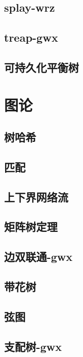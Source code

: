 \documentclass[titlepage,a4paper,10pt]{article}
\begin{document}
\begin{multicols}{2}
\begin{spacing}{0.8}
			\subsection{splay-wrz}
				
			\subsection{treap-gwx}
				
			\subsection{可持久化平衡树}
				
		\section{图论}
			\subsection{树哈希}
				
			\subsection{匹配}
				
			\subsection{上下界网络流}
				
			\subsection{矩阵树定理}
				
			\subsection{边双联通-gwx}
				
			\subsection{带花树}
				
			\subsection{弦图}
				
			\subsection{支配树-gwx}
				

\end{spacing}
\end{multicols}
\end{document}
